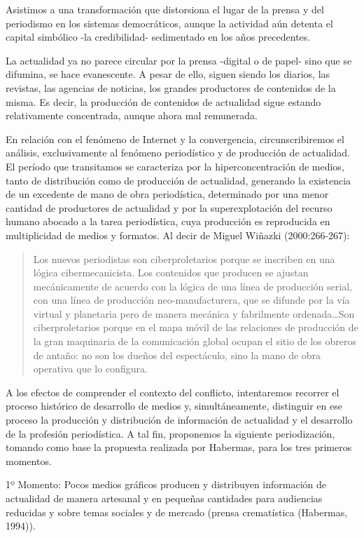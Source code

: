{Asistimos a una transformación que distorsiona el lugar de la prensa y del periodismo en los sistemas democráticos, aunque la actividad aún detenta el capital simbólico -la credibilidad- sedimentado en los años precedentes.

La actualidad ya no parece circular por la prensa -digital o de papel- sino que se difumina, se hace evanescente. A pesar de ello, siguen siendo los diarios, las revistas, las agencias de noticias, los grandes productores de contenidos de la misma. Es decir, la producción de contenidos de actualidad sigue estando relativamente concentrada, aunque ahora mal remunerada.

En relación con el fenómeno de Internet y la convergencia, circunscribiremos el análisis, exclusivamente al fenómeno periodístico y de producción de actualidad. El período que transitamos se caracteriza por la hiperconcentración de medios, tanto de distribución como de producción de actualidad, generando la existencia de un excedente de mano de obra periodística, determinado por una menor cantidad de productores de actualidad y por la superexplotación del recurso humano abocado a la tarea periodística, cuya producción es reproducida en multiplicidad de medios y formatos. Al decir de Miguel Wiñazki (2000:266-267):

\begin{quote}
Los nuevos periodistas son ciberproletarios porque se inscriben en una lógica cibermecanicista. Los contenidos que producen se ajustan mecánicamente de acuerdo con la lógica de una línea de producción serial, con una línea de producción neo-manufacturera, que se difunde por la vía virtual y planetaria pero de manera mecánica y fabrilmente ordenada\ldots Son ciberproletarios porque en el mapa móvil de las relaciones de producción de la gran maquinaria de la comunicación global ocupan el sitio de los obreros de antaño: no son los dueños del espectáculo, sino la mano de obra operativa que lo configura.
\end{quote}

A los efectos de comprender el contexto del conflicto, intentaremos recorrer el proceso histórico de desarrollo de medios y, simultáneamente, distinguir en ese proceso la producción y distribución de información de actualidad y el desarrollo de la profesión periodística. A tal fin, proponemos la siguiente periodización, tomando como base la propuesta realizada por Habermas, para los tres primeros momentos.

1º Momento: Pocos medios gráficos producen y distribuyen información de actualidad de manera artesanal y en pequeñas cantidades para audiencias reducidas y sobre temas sociales y de mercado (prensa crematística (Habermas, 1994)).

}
